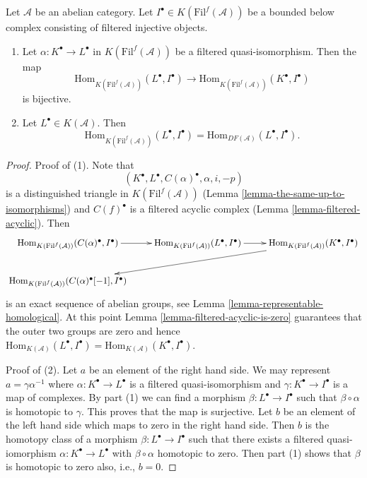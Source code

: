 \begin{lemma}
\label{lemma-morphisms-into-filtered-injective-complex}
Let $\mathcal{A}$ be an abelian category.
Let $I^\bullet \in K(\text{Fil}^f(\mathcal{A}))$
be a bounded below complex consisting of
filtered injective objects.
\begin{enumerate}
\item Let $\alpha : K^\bullet \to L^\bullet$ in $K(\text{Fil}^f(\mathcal{A}))$
be a filtered quasi-isomorphism.
Then the map
$$
\text{Hom}_{K(\text{Fil}^f(\mathcal{A}))}(L^\bullet, I^\bullet)
\to
\text{Hom}_{K(\text{Fil}^f(\mathcal{A}))}(K^\bullet, I^\bullet)
$$
is bijective.
\item Let $L^\bullet \in K(\mathcal{A})$. Then
$$
\text{Hom}_{K(\text{Fil}^f(\mathcal{A}))}(L^\bullet, I^\bullet)
=
\text{Hom}_{DF(\mathcal{A})}(L^\bullet, I^\bullet).
$$
\end{enumerate}
\end{lemma}

\begin{proof}
Proof of (1). Note that
$$
(K^\bullet, L^\bullet, C(\alpha)^\bullet, \alpha, i, -p)
$$
is a distinguished triangle in $K(\text{Fil}^f(\mathcal{A}))$
(Lemma \ref{lemma-the-same-up-to-isomorphisms})
and $C(f)^\bullet$ is a filtered acyclic complex
(Lemma \ref{lemma-filtered-acyclic}).
Then
$$
\xymatrix{
\text{Hom}_{K(\text{Fil}^f(\mathcal{A}))}(C(\alpha)^\bullet, I^\bullet) \ar[r] &
\text{Hom}_{K(\text{Fil}^f(\mathcal{A}))}(L^\bullet, I^\bullet) \ar[r] &
\text{Hom}_{K(\text{Fil}^f(\mathcal{A}))}(K^\bullet, I^\bullet) \ar[lld] \\
\text{Hom}_{K(\text{Fil}^f(\mathcal{A}))}(C(\alpha)^\bullet[-1], I^\bullet)
}
$$
is an exact sequence of abelian groups, see
Lemma \ref{lemma-representable-homological}.
At this point
Lemma \ref{lemma-filtered-acyclic-is-zero}
guarantees that the outer two groups are zero and hence
$\text{Hom}_{K(\mathcal{A})}(L^\bullet, I^\bullet) =
\text{Hom}_{K(\mathcal{A})}(K^\bullet, I^\bullet)$.

\medskip\noindent
Proof of (2).
Let $a$ be an element of the right hand side.
We may represent $a = \gamma\alpha^{-1}$ where
$\alpha : K^\bullet \to L^\bullet$
is a filtered quasi-isomorphism and $\gamma : K^\bullet \to I^\bullet$
is a map of complexes. By part (1)
we can find a morphism $\beta : L^\bullet \to I^\bullet$ such that
$\beta \circ \alpha$ is homotopic to $\gamma$. This proves that the
map is surjective. Let $b$ be an element of the left hand side
which maps to zero in the right hand side. Then $b$ is the homotopy class
of a morphism $\beta : L^\bullet \to I^\bullet$ such that there exists a
filtered quasi-iomorphism $\alpha : K^\bullet \to L^\bullet$ with
$\beta  \circ \alpha$ homotopic to zero. Then part (1)
shows that $\beta$ is homotopic to zero also, i.e., $b = 0$.
\end{proof}


